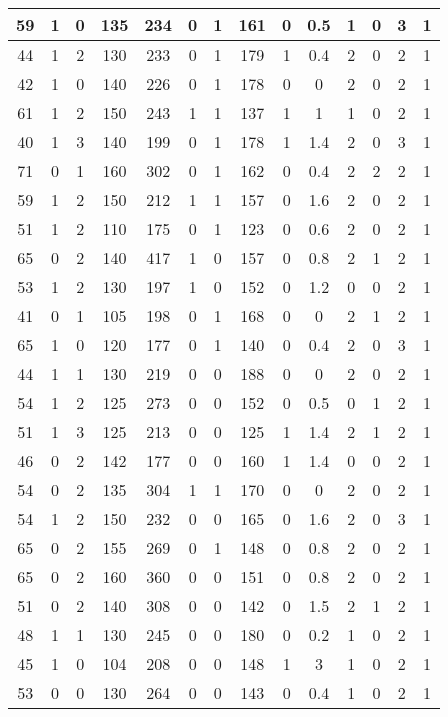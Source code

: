 \documentclass{article}
\begin{document}
\begin{longtable}{|c|c|c|c|c|c|c|c|c|c|c|c|c|c|}
\hline
59 & 1 & 0 & 135 & 234 & 0 & 1 & 161 & 0 & 0.5 & 1 & 0 & 3 & 1\\
\hline
44 & 1 & 2 & 130 & 233 & 0 & 1 & 179 & 1 & 0.4 & 2 & 0 & 2 & 1\\
\hline
42 & 1 & 0 & 140 & 226 & 0 & 1 & 178 & 0 & 0 & 2 & 0 & 2 & 1\\
\hline
61 & 1 & 2 & 150 & 243 & 1 & 1 & 137 & 1 & 1 & 1 & 0 & 2 & 1\\
\hline
40 & 1 & 3 & 140 & 199 & 0 & 1 & 178 & 1 & 1.4 & 2 & 0 & 3 & 1\\
\hline
71 & 0 & 1 & 160 & 302 & 0 & 1 & 162 & 0 & 0.4 & 2 & 2 & 2 & 1\\
\hline
59 & 1 & 2 & 150 & 212 & 1 & 1 & 157 & 0 & 1.6 & 2 & 0 & 2 & 1\\
\hline
51 & 1 & 2 & 110 & 175 & 0 & 1 & 123 & 0 & 0.6 & 2 & 0 & 2 & 1\\
\hline
65 & 0 & 2 & 140 & 417 & 1 & 0 & 157 & 0 & 0.8 & 2 & 1 & 2 & 1\\
\hline
53 & 1 & 2 & 130 & 197 & 1 & 0 & 152 & 0 & 1.2 & 0 & 0 & 2 & 1\\
\hline
41 & 0 & 1 & 105 & 198 & 0 & 1 & 168 & 0 & 0 & 2 & 1 & 2 & 1\\
\hline
65 & 1 & 0 & 120 & 177 & 0 & 1 & 140 & 0 & 0.4 & 2 & 0 & 3 & 1\\
\hline
44 & 1 & 1 & 130 & 219 & 0 & 0 & 188 & 0 & 0 & 2 & 0 & 2 & 1\\
\hline
54 & 1 & 2 & 125 & 273 & 0 & 0 & 152 & 0 & 0.5 & 0 & 1 & 2 & 1\\
\hline
51 & 1 & 3 & 125 & 213 & 0 & 0 & 125 & 1 & 1.4 & 2 & 1 & 2 & 1\\
\hline
46 & 0 & 2 & 142 & 177 & 0 & 0 & 160 & 1 & 1.4 & 0 & 0 & 2 & 1\\
\hline
54 & 0 & 2 & 135 & 304 & 1 & 1 & 170 & 0 & 0 & 2 & 0 & 2 & 1\\
\hline
54 & 1 & 2 & 150 & 232 & 0 & 0 & 165 & 0 & 1.6 & 2 & 0 & 3 & 1\\
\hline
65 & 0 & 2 & 155 & 269 & 0 & 1 & 148 & 0 & 0.8 & 2 & 0 & 2 & 1\\
\hline
65 & 0 & 2 & 160 & 360 & 0 & 0 & 151 & 0 & 0.8 & 2 & 0 & 2 & 1\\
\hline
51 & 0 & 2 & 140 & 308 & 0 & 0 & 142 & 0 & 1.5 & 2 & 1 & 2 & 1\\
\hline
48 & 1 & 1 & 130 & 245 & 0 & 0 & 180 & 0 & 0.2 & 1 & 0 & 2 & 1\\
\hline
45 & 1 & 0 & 104 & 208 & 0 & 0 & 148 & 1 & 3 & 1 & 0 & 2 & 1\\
\hline
53 & 0 & 0 & 130 & 264 & 0 & 0 & 143 & 0 & 0.4 & 1 & 0 & 2 & 1\\

\end{longtable}
\end{document}
